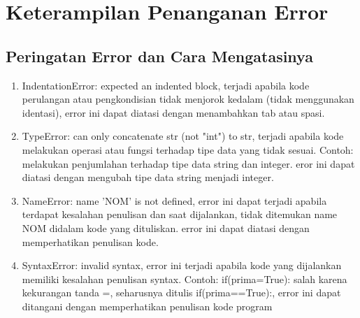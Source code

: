 \section{Keterampilan Penanganan Error}
\subsection{Peringatan Error dan Cara Mengatasinya}
\begin{enumerate}
 \item IndentationError: expected an indented block, terjadi apabila kode perulangan atau pengkondisian tidak menjorok kedalam (tidak menggunakan identasi), error ini dapat diatasi dengan menambahkan tab atau spasi.
 \item TypeError: can only concatenate str (not "int") to str, terjadi apabila kode melakukan operasi atau fungsi terhadap tipe data yang tidak sesuai. Contoh: melakukan penjumlahan terhadap tipe data string dan integer. eror ini dapat diatasi dengan mengubah tipe data string menjadi integer.
 \item NameError: name 'NOM' is not defined, error ini dapat terjadi apabila terdapat kesalahan penulisan dan saat dijalankan, tidak ditemukan name NOM didalam kode yang dituliskan. error ini dapat diatasi dengan memperhatikan penulisan kode. 
 \item SyntaxError: invalid syntax, error ini terjadi apabila kode yang dijalankan memiliki kesalahan penulisan syntax. Contoh: if(prima=True): salah karena kekurangan tanda =, seharusnya ditulis if(prima==True):, error ini dapat ditangani dengan memperhatikan penulisan kode program
\end{enumerate}